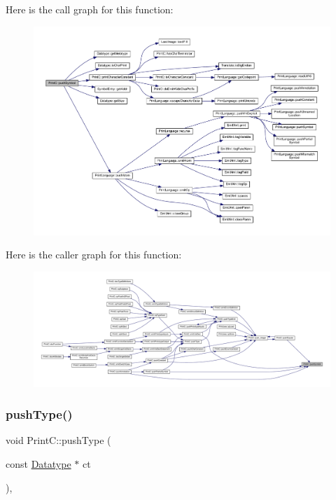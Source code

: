 Here is the call graph for this function\+:
\nopagebreak
\begin{figure}[H]
\begin{center}
\leavevmode
\includegraphics[width=350pt]{class_print_c_a22e493008d4ba06482b42fe1875be235_cgraph}
\end{center}
\end{figure}
Here is the caller graph for this function\+:
\nopagebreak
\begin{figure}[H]
\begin{center}
\leavevmode
\includegraphics[width=350pt]{class_print_c_a22e493008d4ba06482b42fe1875be235_icgraph}
\end{center}
\end{figure}
\mbox{\label{class_print_c_a210e44709553449b4d03596f137dfb10}} 
\subsubsection{\texorpdfstring{pushType()}{pushType()}}
{\footnotesize\ttfamily void Print\+C\+::push\+Type (\begin{DoxyParamCaption}\item[{const \mbox{\hyperlink{class_datatype}{Datatype}} $\ast$}]{ct }\end{DoxyParamCaption})\hspace{0.3cm}{\ttfamily [protected]}, {\ttfamily [virtual]}}



